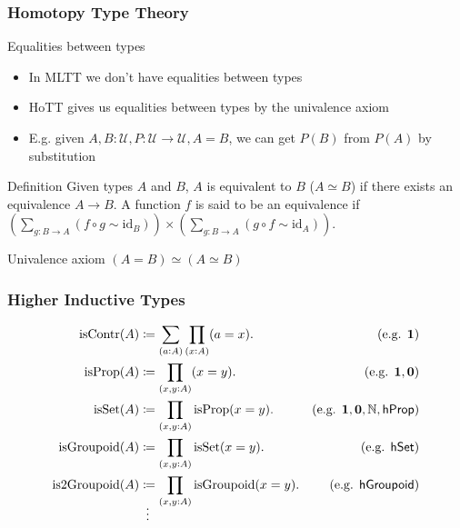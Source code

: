 \documentclass{beamer}
\begin{document}
\begin{frame}
\frametitle{Homotopy Type Theory}

Equalities between types

\begin{itemize}

  \item In MLTT we don't have equalities between types
  \item HoTT gives us equalities between types by the univalence axiom 
  \item E.g. given $A, B : \mathcal{U}, P : \mathcal{U} \rightarrow \mathcal{U}, A = B$,
        we can get $P(B)$ from $P(A)$ by substitution

\end{itemize}

\begin{block}{Definition}
  Given types $A$ and $B$, $A$ is equivalent to $B$ ($A \simeq B$) if there exists an
  equivalence $A \rightarrow B$.
  A function $f$ is said to be an equivalence if
  $\left( \sum_{g :B \rightarrow A} (f \circ g \sim \mathrm{id}_B) \right) \times \left( \sum_{g:B \rightarrow A} (g \circ f \sim \mathrm{id}_A) \right)$.
\end{block}

\begin{block}{Univalence axiom}
  $(A = B) \simeq (A \simeq B)$
\end{block}


\end{frame}

\begin{frame}
\frametitle{Higher Inductive Types}

\begin{align*}
  \text{isContr}(A) & \coloneqq \sum_{(a:A)} \prod_{(x:A)} (a = x).
  & \text{(e.g. $\mathbf{1}$)} \\
  \text{isProp}(A) & \coloneqq \prod_{(x,y:A)} (x = y).
  & \text{(e.g. $\mathbf{1}, \mathbf{0}$)} \\
  \text{isSet}(A) & \coloneqq \prod_{(x,y:A)} \text{isProp}(x = y).
  & \text{(e.g. $\mathbf{1}, \mathbf{0}, \mathbb{N}, \mathsf{hProp}$)} \\
  \text{isGroupoid}(A) & \coloneqq \prod_{(x,y:A)} \text{isSet}(x = y).
  & \text{(e.g. $\mathsf{hSet}$)} \\
  \text{is2Groupoid}(A) & \coloneqq \prod_{(x,y:A)} \text{isGroupoid}(x = y).
  & \text{(e.g. $\mathsf{hGroupoid}$)} \\
  \shortvdotswithin{=}
\end{align*}

\end{frame}
\end{document}
